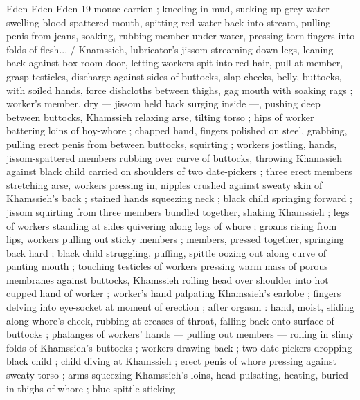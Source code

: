 Eden Eden Eden 19
mouse-carrion ; kneeling in mud, sucking up grey water swelling
blood-spattered mouth, spitting red water back into stream, pulling
penis from jeans, soaking, rubbing member under water, pressing
torn fingers into folds of flesh... / Knamssieh, lubricator's jissom
streaming down legs, leaning back against box-room door, letting
workers spit into red hair, pull at member, grasp testicles, discharge
against sides of buttocks, slap cheeks, belly, buttocks, with soiled
hands, force dishcloths between thighs, gag mouth with soaking rags
; worker's member, dry — jissom held back surging inside —,
pushing deep between buttocks, Khamssieh relaxing arse, tilting
torso ; hips of worker battering loins of boy-whore ; chapped hand,
fingers polished on steel, grabbing, pulling erect penis from between
buttocks, squirting ; workers jostling, hands, jissom-spattered
members rubbing over curve of buttocks, throwing Khamssieh
against black child carried on shoulders of two date-pickers ; three
erect members stretching arse, workers pressing in, nipples crushed
against sweaty skin of Khamssieh’s back ; stained hands squeezing
neck ; black child springing forward ; jissom squirting from three
members bundled together, shaking Khamssieh ; legs of workers
standing at sides quivering along legs of whore ; groans rising from
lips, workers pulling out sticky members ; members, pressed
together, springing back hard ; black child struggling, puffing, spittle
oozing out along curve of panting mouth ; touching testicles of
workers pressing warm mass of porous membranes against buttocks,
Khamssieh rolling head over shoulder into hot cupped hand of
worker ; worker's hand palpating Khamssieh's earlobe ; fingers
delving into eye-socket at moment of erection ; after orgasm : hand,
moist, sliding along whore's cheek, rubbing at creases of throat,
falling back onto surface of buttocks ; phalanges of workers’ hands
— pulling out members — rolling in slimy folds of Khamssieh's
buttocks ; workers drawing back ; two date-pickers dropping black
child ; child diving at Khamssieh ; erect penis of whore pressing
against sweaty torso ; arms squeezing Khamssieh’s loins, head
pulsating, heating, buried in thighs of whore ; blue spittle sticking

